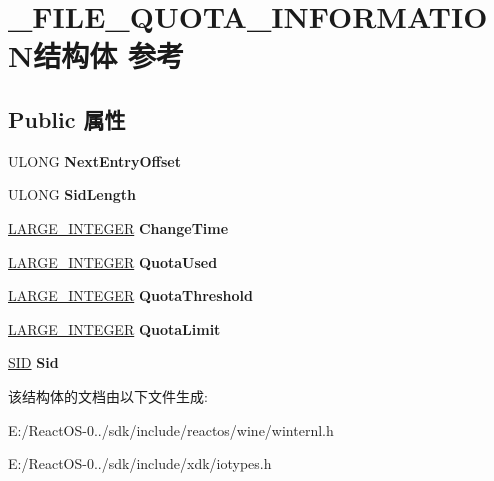 \hypertarget{struct___f_i_l_e___q_u_o_t_a___i_n_f_o_r_m_a_t_i_o_n}{}\section{\+\_\+\+F\+I\+L\+E\+\_\+\+Q\+U\+O\+T\+A\+\_\+\+I\+N\+F\+O\+R\+M\+A\+T\+I\+O\+N结构体 参考}
\label{struct___f_i_l_e___q_u_o_t_a___i_n_f_o_r_m_a_t_i_o_n}
\subsection*{Public 属性}
\begin{DoxyCompactItemize}
\item 
\mbox{\label{struct___f_i_l_e___q_u_o_t_a___i_n_f_o_r_m_a_t_i_o_n_aeea8e752da1a6a93b5cea0bb272101b9}} 
U\+L\+O\+NG {\bfseries Next\+Entry\+Offset}
\item 
\mbox{\label{struct___f_i_l_e___q_u_o_t_a___i_n_f_o_r_m_a_t_i_o_n_a3203a9ed10a7671cbfc527b2d1492b7e}} 
U\+L\+O\+NG {\bfseries Sid\+Length}
\item 
\mbox{\label{struct___f_i_l_e___q_u_o_t_a___i_n_f_o_r_m_a_t_i_o_n_afd25e6699e54ea99238ff137df72f1fc}} 
\hyperlink{union___l_a_r_g_e___i_n_t_e_g_e_r}{L\+A\+R\+G\+E\+\_\+\+I\+N\+T\+E\+G\+ER} {\bfseries Change\+Time}
\item 
\mbox{\label{struct___f_i_l_e___q_u_o_t_a___i_n_f_o_r_m_a_t_i_o_n_a8b5c7e5100cdb29a0bb86dcb11cb1c83}} 
\hyperlink{union___l_a_r_g_e___i_n_t_e_g_e_r}{L\+A\+R\+G\+E\+\_\+\+I\+N\+T\+E\+G\+ER} {\bfseries Quota\+Used}
\item 
\mbox{\label{struct___f_i_l_e___q_u_o_t_a___i_n_f_o_r_m_a_t_i_o_n_adad170aa06e6ffe93062b86691273f71}} 
\hyperlink{union___l_a_r_g_e___i_n_t_e_g_e_r}{L\+A\+R\+G\+E\+\_\+\+I\+N\+T\+E\+G\+ER} {\bfseries Quota\+Threshold}
\item 
\mbox{\label{struct___f_i_l_e___q_u_o_t_a___i_n_f_o_r_m_a_t_i_o_n_a3adb89ff6b765b195c967bd687034d3d}} 
\hyperlink{union___l_a_r_g_e___i_n_t_e_g_e_r}{L\+A\+R\+G\+E\+\_\+\+I\+N\+T\+E\+G\+ER} {\bfseries Quota\+Limit}
\item 
\mbox{\label{struct___f_i_l_e___q_u_o_t_a___i_n_f_o_r_m_a_t_i_o_n_a7762d5ce35d6ae5f9f6c68dab5feebfc}} 
\hyperlink{struct___s_i_d}{S\+ID} {\bfseries Sid}
\end{DoxyCompactItemize}


该结构体的文档由以下文件生成\+:\begin{DoxyCompactItemize}
\item 
E\+:/\+React\+O\+S-\/0../sdk/include/reactos/wine/winternl.\+h\item 
E\+:/\+React\+O\+S-\/0../sdk/include/xdk/iotypes.\+h\end{DoxyCompactItemize}
